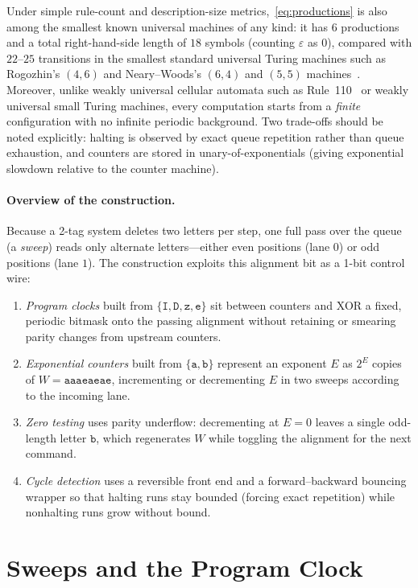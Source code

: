 \documentclass{article}
\theoremstyle{definition}
\theoremstyle{remark}
\newcommand{\ttw}[1]{\texttt{#1}}
\begin{document}
Under simple rule-count and description-size metrics,~\eqref{eq:productions} is also among the smallest known universal machines of any kind: it has $6$ productions and a total right-hand-side length of $18$ symbols (counting $\varepsilon$ as $0$), compared with $22$--$25$ transitions in the smallest standard universal Turing machines such as Rogozhin's $(4,6)$ and Neary--Woods's $(6,4)$ and $(5,5)$ machines~\cite{Rogozhin1996,NearyWoods2009}.
Moreover, unlike weakly universal cellular automata such as Rule~110~\cite{Cook2004} or weakly universal small Turing machines, every computation starts from a \emph{finite} configuration with no infinite periodic background.
Two trade-offs should be noted explicitly: halting is observed by exact queue repetition rather than queue exhaustion, and counters are stored in unary-of-exponentials (giving exponential slowdown relative to the counter machine).

\paragraph{Overview of the construction.}
Because a 2-tag system deletes two letters per step, one full pass over the queue (a \emph{sweep}) reads only alternate letters---either even positions (lane $0$) or odd positions (lane $1$).
The construction exploits this alignment bit as a 1-bit control wire:
\begin{enumerate}
\item \emph{Program clocks} built from $\{\ttw{I},\ttw{D},\ttw{z},\ttw{e}\}$ sit between counters and XOR a fixed, periodic bitmask onto the passing alignment without retaining or smearing parity changes from upstream counters.
\item \emph{Exponential counters} built from $\{\ttw{a},\ttw{b}\}$ represent an exponent $E$ as $2^E$ copies of $W = \ttw{aaaeaeae}$, incrementing or decrementing $E$ in two sweeps according to the incoming lane.
\item \emph{Zero testing} uses parity underflow: decrementing at $E=0$ leaves a single odd-length letter $\ttw{b}$, which regenerates $W$ while toggling the alignment for the next command.
\item \emph{Cycle detection} uses a reversible front end and a forward--backward bouncing wrapper so that halting runs stay bounded (forcing exact repetition) while nonhalting runs grow without bound.
\end{enumerate}

\section{Sweeps and the Program Clock}
\end{document}
